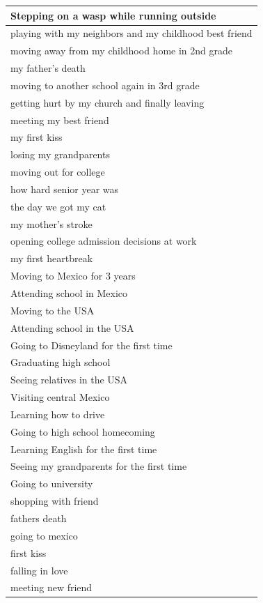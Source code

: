 \documentclass[
  .7em,
  letterpaper,
  DIV=11,
  numbers=noendperiod]{scrartcl}
\begin{document}
\begin{table}
\begin{tabular}{l}
\hline
Stepping on a wasp while running outside\\
\hline
playing with my neighbors and my childhood best friend\\
\hline
moving away from my childhood home in 2nd grade\\
\hline
my father's death\\
\hline
moving to another school again in 3rd grade\\
\hline
getting hurt by my church and finally leaving\\
\hline
meeting my best friend\\
\hline
my first kiss\\
\hline
losing my grandparents\\
\hline
moving out for college\\
\hline
how hard senior year was\\
\hline
the day we got my cat\\
\hline
my mother's stroke\\
\hline
opening college admission decisions at work\\
\hline
my first heartbreak\\
\hline
Moving to Mexico for 3 years\\
\hline
Attending school in Mexico\\
\hline
Moving to the USA\\
\hline
Attending school in the USA\\
\hline
Going to Disneyland for the first time\\
\hline
Graduating high school\\
\hline
Seeing relatives in the USA\\
\hline
Visiting central Mexico\\
\hline
Learning how to drive\\
\hline
Going to high school homecoming\\
\hline
Learning English for the first time\\
\hline
Seeing my grandparents for the first time\\
\hline
Going to university\\
\hline
shopping with friend\\
\hline
fathers death\\
\hline
going to mexico\\
\hline
first kiss\\
\hline
falling in love\\
\hline
meeting new friend\\
\hline

\end{tabular}
\end{table}
\end{document}
